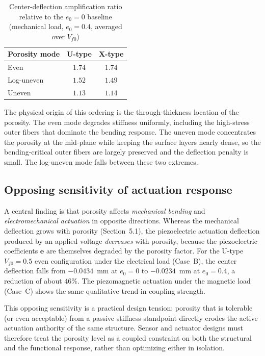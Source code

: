 \documentclass[11pt,a4paper]{article}
\begin{document}
\begin{table}[H]
\centering
\caption{Center-deflection amplification ratio relative to the $e_0=0$ baseline (mechanical load, $e_0=0.4$, averaged over $V_{f0}$)}
\label{tab:defl-ratio}
\begin{tabular}{lcc}
\toprule
\textbf{Porosity mode} & \textbf{U-type} & \textbf{X-type} \\
\midrule
Even        & $1.74$ & $1.74$ \\
Log-uneven  & $1.52$ & $1.49$ \\
Uneven      & $1.13$ & $1.14$ \\
\bottomrule
\end{tabular}
\end{table}

The physical origin of this ordering is the through-thickness location of the porosity. The even mode degrades stiffness uniformly, including the high-stress outer fibers that dominate the bending response. The uneven mode concentrates the porosity at the mid-plane while keeping the surface layers nearly dense, so the bending-critical outer fibers are largely preserved and the deflection penalty is small. The log-uneven mode falls between these two extremes.

\subsection{Opposing sensitivity of actuation response}

A central finding is that porosity affects \emph{mechanical bending} and \emph{electromechanical actuation} in opposite directions. Whereas the mechanical deflection grows with porosity (Section~5.1), the piezoelectric actuation deflection produced by an applied voltage \emph{decreases} with porosity, because the piezoelectric coefficients $\bm{e}$ are themselves degraded by the porosity factor. For the U-type $V_{f0}=0.5$ even configuration under the electrical load (Case~B), the center deflection falls from $-0.0434$~mm at $e_0=0$ to $-0.0234$~mm at $e_0=0.4$, a reduction of about $46\%$. The piezomagnetic actuation under the magnetic load (Case~C) shows the same qualitative trend in coupling strength.

This opposing sensitivity is a practical design tension: porosity that is tolerable (or even acceptable) from a passive stiffness standpoint directly erodes the active actuation authority of the same structure. Sensor and actuator designs must therefore treat the porosity level as a coupled constraint on both the structural and the functional response, rather than optimizing either in isolation.
\end{document}
